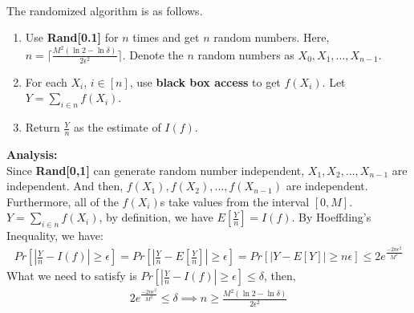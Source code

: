 \noindent {}\\
The randomized algorithm is as follows.
\begin{enumerate}
    \item Use \textbf{Rand[0.1]} for $n$ times and get $n$ random numbers.
    Here, $n=\lceil \frac{M^2(\ln 2-\ln \delta)}{2\epsilon^2}\rceil $.
    Denote the $n$ random numbers as $X_0, X_1, ..., X_{n-1}$.
    \item For each $X_i$, $i\in [n]$, use \textbf{black box access} to get $f(X_i)$.
    Let $Y=\sum_{i\in n}f(X_i)$.
    \item Return $\frac{Y}{n}$ as the estimate of $I(f)$.
\end{enumerate}
\textbf{Analysis:}\\
Since \textbf{Rand[0,1]} can generate random number independent,
$X_1, X_2,..., X_{n-1}$ are independent.
And then, $f(X_1), f(X_2),..., f(X_{n-1})$ are independent.
Furthermore, all of the $f(X_i)$s take values from the interval $[0, M]$.
$Y=\sum_{i\in n}f(X_i)$, by definition, we have $E[\frac{Y}{n}]=I(f)$.
By Hoeffding's Inequality, we have:
\begin{align}
    \nonumber Pr[|\frac{Y}{n}-I(f)|\ge\epsilon]=Pr[|\frac{Y}{n}-E[\frac{Y}{n}]|\ge\epsilon]
    =Pr[|Y-E[Y]|\ge n\epsilon]\le 2e^{\frac{-2n\epsilon^2}{M^2}}
\end{align}
What we need to satisfy is $Pr[|\frac{Y}{n}-I(f)|\ge\epsilon]\le \delta$, then,
\begin{align}
    \nonumber 2e^{\frac{-2n\epsilon^2}{M^2}} \le \delta \implies n\ge \frac{M^2(\ln 2-\ln \delta)}{2\epsilon^2}
\end{align}

